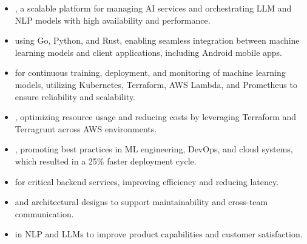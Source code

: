 
\begin{itemize}

  \item {}, a scalable platform for managing AI services and orchestrating LLM and NLP models with high availability and performance.

  \item {} using Go, Python, and Rust, enabling seamless integration between machine learning models and client applications, including Android mobile apps.

  \item {} for continuous training, deployment, and monitoring of machine learning models, utilizing Kubernetes, Terraform, AWS Lambda, and Prometheus to ensure reliability and scalability.

  \item {}, optimizing resource usage and reducing costs by leveraging Terraform and Terragrunt across AWS environments.

  \item {}, promoting best practices in ML engineering, DevOps, and cloud systems, which resulted in a 25\% faster deployment cycle.

  \item {} for critical backend services, improving efficiency and reducing latency.

  \item {} and architectural designs to support maintainability and cross-team communication.

  \item {} in NLP and LLMs to improve product capabilities and customer satisfaction.

\end{itemize}

